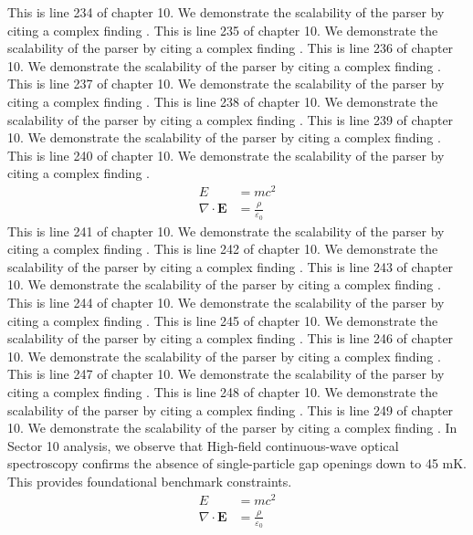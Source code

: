 This is line 234 of chapter 10. We demonstrate the scalability of the parser by citing a complex finding \cite{ref10_234}.
This is line 235 of chapter 10. We demonstrate the scalability of the parser by citing a complex finding \cite{ref10_235}.
This is line 236 of chapter 10. We demonstrate the scalability of the parser by citing a complex finding \cite{ref10_236}.
This is line 237 of chapter 10. We demonstrate the scalability of the parser by citing a complex finding \cite{ref10_237}.
This is line 238 of chapter 10. We demonstrate the scalability of the parser by citing a complex finding \cite{ref10_238}.
This is line 239 of chapter 10. We demonstrate the scalability of the parser by citing a complex finding \cite{ref10_239}.
This is line 240 of chapter 10. We demonstrate the scalability of the parser by citing a complex finding \cite{ref10_240}.
\begin{align*}
  E &= mc^2 \\
  \nabla \cdot \mathbf{E} &= \frac{\rho}{\varepsilon_0}
\end{align*}
This is line 241 of chapter 10. We demonstrate the scalability of the parser by citing a complex finding \cite{ref10_241}.
This is line 242 of chapter 10. We demonstrate the scalability of the parser by citing a complex finding \cite{ref10_242}.
This is line 243 of chapter 10. We demonstrate the scalability of the parser by citing a complex finding \cite{ref10_243}.
This is line 244 of chapter 10. We demonstrate the scalability of the parser by citing a complex finding \cite{ref10_244}.
This is line 245 of chapter 10. We demonstrate the scalability of the parser by citing a complex finding \cite{ref10_245}.
This is line 246 of chapter 10. We demonstrate the scalability of the parser by citing a complex finding \cite{ref10_246}.
This is line 247 of chapter 10. We demonstrate the scalability of the parser by citing a complex finding \cite{ref10_247}.
This is line 248 of chapter 10. We demonstrate the scalability of the parser by citing a complex finding \cite{ref10_248}.
This is line 249 of chapter 10. We demonstrate the scalability of the parser by citing a complex finding \cite{ref10_249}.
In Sector 10 analysis, we observe that High-field continuous-wave optical spectroscopy confirms the absence of single-particle gap openings down to 45 mK. This provides foundational benchmark constraints.
\begin{align*}
  E &= mc^2 \\
  \nabla \cdot \mathbf{E} &= \frac{\rho}{\varepsilon_0}
\end{align*}
